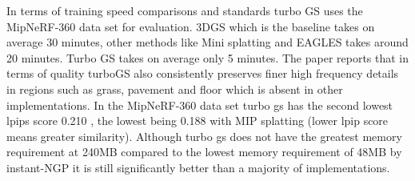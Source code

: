 \documentclass[10pt,twocolumn]{article}
\begin{document}
In terms of training speed comparisons and standards turbo GS uses the MipNeRF-360 data set for evaluation. 3DGS which is the baseline takes on average 30 minutes, other methods like Mini splatting and EAGLES takes around 20 minutes. Turbo GS takes on average only 5 minutes\cite{lu2024turbogsaccelerating3dgaussian}. The paper reports that in terms of quality turboGS also consistently preserves finer high frequency details in regions such as grass, pavement and floor which is absent in other implementations. In the MipNeRF-360 data set turbo gs has the second lowest lpips score 0.210 , the lowest being 0.188 with MIP splatting\cite{lu2024turbogsaccelerating3dgaussian} (lower lpip score means greater similarity). Although turbo gs does not have the greatest memory requirement at 240MB compared to the lowest memory requirement of 48MB by instant-NGP it is still significantly better than a majority of implementations.

\printbibliography
\end{document}

